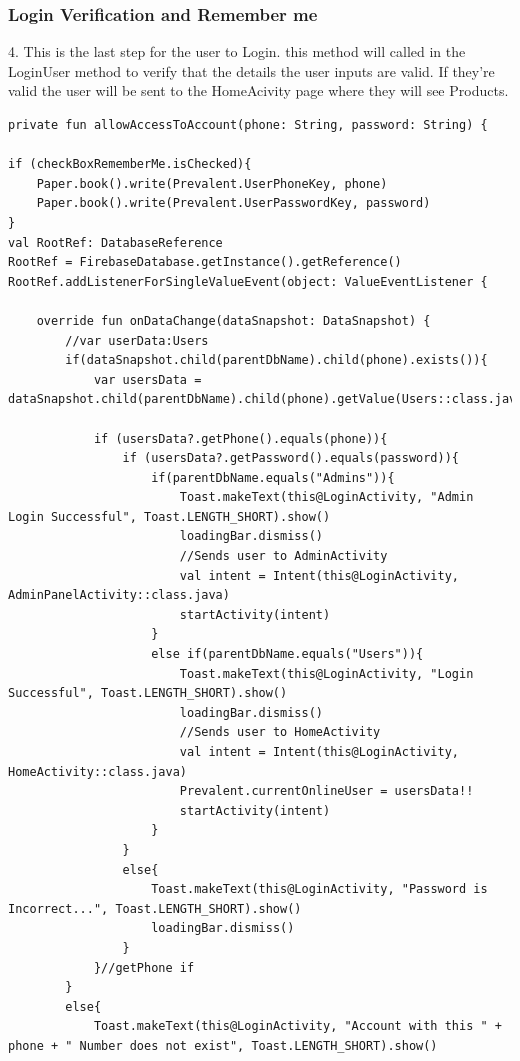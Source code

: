 \subsubsection{Login Verification and Remember me}
4. This is the last step for the user to Login. this method will called in the LoginUser method to verify that the details the user inputs are valid. If they're valid the user will be sent to the HomeAcivity page where they will see Products.
\begin{verbatim}
private fun allowAccessToAccount(phone: String, password: String) {

if (checkBoxRememberMe.isChecked){
    Paper.book().write(Prevalent.UserPhoneKey, phone)
    Paper.book().write(Prevalent.UserPasswordKey, password)
}
val RootRef: DatabaseReference
RootRef = FirebaseDatabase.getInstance().getReference()
RootRef.addListenerForSingleValueEvent(object: ValueEventListener {

    override fun onDataChange(dataSnapshot: DataSnapshot) {
        //var userData:Users
        if(dataSnapshot.child(parentDbName).child(phone).exists()){
            var usersData = dataSnapshot.child(parentDbName).child(phone).getValue(Users::class.java)

            if (usersData?.getPhone().equals(phone)){
                if (usersData?.getPassword().equals(password)){
                    if(parentDbName.equals("Admins")){
                        Toast.makeText(this@LoginActivity, "Admin Login Successful", Toast.LENGTH_SHORT).show()
                        loadingBar.dismiss()
                        //Sends user to AdminActivity
                        val intent = Intent(this@LoginActivity, AdminPanelActivity::class.java)
                        startActivity(intent)
                    }
                    else if(parentDbName.equals("Users")){
                        Toast.makeText(this@LoginActivity, "Login Successful", Toast.LENGTH_SHORT).show()
                        loadingBar.dismiss()
                        //Sends user to HomeActivity
                        val intent = Intent(this@LoginActivity, HomeActivity::class.java)
                        Prevalent.currentOnlineUser = usersData!!
                        startActivity(intent)
                    }
                }
                else{
                    Toast.makeText(this@LoginActivity, "Password is Incorrect...", Toast.LENGTH_SHORT).show()
                    loadingBar.dismiss()
                }
            }//getPhone if
        }
        else{
            Toast.makeText(this@LoginActivity, "Account with this " + phone + " Number does not exist", Toast.LENGTH_SHORT).show()
       
\end{verbatim}
\newpage
